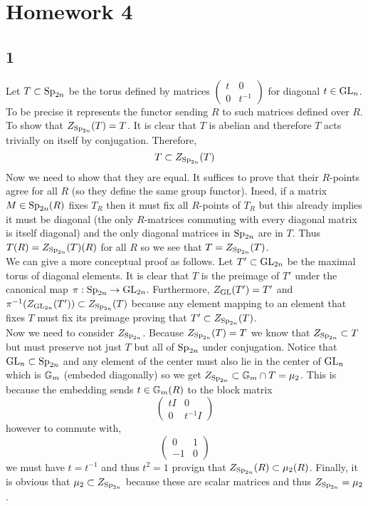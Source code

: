 \documentclass[12pt]{article}
\begin{document}
\section{Homework 4}

\subsection{1}

Let $T \subset \mathrm{Sp}_{2n}$ be the torus defined by matrices 
$\begin{pmatrix}
t & 0
\\
0 & t^{-1} 
\end{pmatrix}$ for diagonal $t \in \mathrm{GL}_{n}$. To be precise it represents the functor sending $R$ to such matrices defined over $R$. To show that $Z_{\mathrm{Sp}_{2n}}(T) = T$. It is clear that $T$ is abelian and therefore $T$ acts trivially on itself by conjugation. Therefore,
\[ T \subset Z_{\mathrm{Sp}_{2n}}(T) \]
Now we need to show that they are equal. It suffices to prove that their $R$-points agree for all $R$ (so they define the same group functor). Ineed, if a matrix $M \in \mathrm{Sp}_{2n}(R)$ fixes $T_R$ then it must fix all $R$-points of $T_R$ but this already implies it must be diagonal (the only $R$-matrices commuting with every diagonal matrix is itself diagonal) and the only diagonal matrices in $\mathrm{Sp}_{2n}$ are in $T$. Thus $T(R) = Z_{\mathrm{Sp}_{2n}}(T)(R)$ for all $R$ so we see that $T = Z_{\mathrm{Sp}_{2n}}(T)$. 
\bigskip\\
We can give a more conceptual proof as follows. Let $T' \subset \mathrm{GL}_{2n}$ be the maximal torus of diagonal elements. It is clear that $T$ is the preimage of $T'$ under the canonical map $\pi : \mathrm{Sp}_{2n} \to \mathrm{GL}_{2n}$. Furthermore, $Z_{\mathrm{GL}}(T') = T'$ and $\pi^{-1}(Z_{\mathrm{GL}_{2n}}(T')) \subset Z_{\mathrm{Sp}_{2n}}(T)$ because any element mapping to an element that fixes $T$ must fix its preimage proving that $T' \subset Z_{\mathrm{Sp}_{2n}}(T)$.
\bigskip\\
Now we need to consider $Z_{\mathrm{Sp}_{2n}}$. Because $Z_{\mathrm{Sp}_{2n}}(T) = T$ we know that $Z_{\mathrm{Sp}_{2n}} \subset T$ but must preserve not just $T$ but all of $\mathrm{Sp}_{2n}$ under conjugation. Notice that $\mathrm{GL}_n \subset \mathrm{Sp}_{2n}$ and any element of the center must also lie in the center of $\mathrm{GL}_n$ which is $\mathbb{G}_m$ (embeded diagonally) so we get $Z_{\mathrm{Sp}_{2n}} \subset \mathbb{G}_m \cap T = \mu_2$. This is because the embedding sends $t \in \mathbb{G}_m(R)$ to the block matrix 
\[ \begin{pmatrix}
t I & 0
\\
0 & t^{-1} I
\end{pmatrix} \] 
however to commute with,
\[ \begin{pmatrix}
0 & 1
\\
-1 & 0
\end{pmatrix} \]
we must have $t = t^{-1}$ and thus $t^2 = 1$ provign that $Z_{\mathrm{Sp}_{2n}}(R) \subset \mu_2(R)$.
Finally, it is obvious that $\mu_2 \subset Z_{\mathrm{Sp}_{2n}}$ because these are scalar matrices and thus $Z_{\mathrm{Sp}_{2n}} = \mu_2$.
\end{document}
